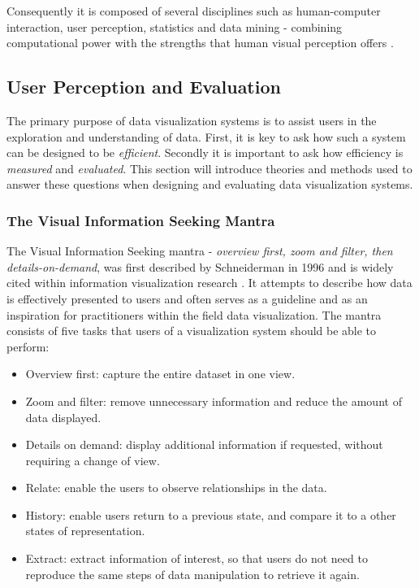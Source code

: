 \documentclass{kththesis}
\begin{document}
Consequently it is composed of several disciplines such as human-computer interaction, user perception, statistics and data mining - combining computational power with the strengths that human visual perception offers \cite{Chad}.

\subsection{User Perception and Evaluation}

The primary purpose of data visualization systems is to assist users in the exploration and understanding of data. First, it is key to ask how such a system can be designed to be \emph{efficient}. Secondly it is important to ask how efficiency is \emph{measured} and \emph{evaluated}. This section will introduce theories and methods used to answer these questions when designing and evaluating data visualization systems.

\subsubsection{The Visual Information Seeking Mantra}
The Visual Information Seeking mantra - \emph{overview first, zoom and filter, then details-on-demand}, was first described by Schneiderman in 1996 and is widely cited within information visualization research \cite{Craft}. It attempts to describe how data is effectively presented to users and often serves as a guideline and as an inspiration for practitioners within the field data visualization. The mantra consists of five tasks that users of a visualization system should be able to perform:


\begin{itemize}
    \item Overview first: capture the entire dataset in one view.
    \item Zoom and filter: remove unnecessary information and reduce the amount of data displayed.
    \item Details on demand: display additional information if requested, without requiring a change of view.
    \item Relate: enable the users to observe relationships in the data.
    \item History: enable users return to a previous state, and compare it to a other states of representation.
    \item Extract: extract information of interest, so that users do not need to reproduce the same steps of data manipulation to retrieve it again.
\end{itemize}
\end{document}

